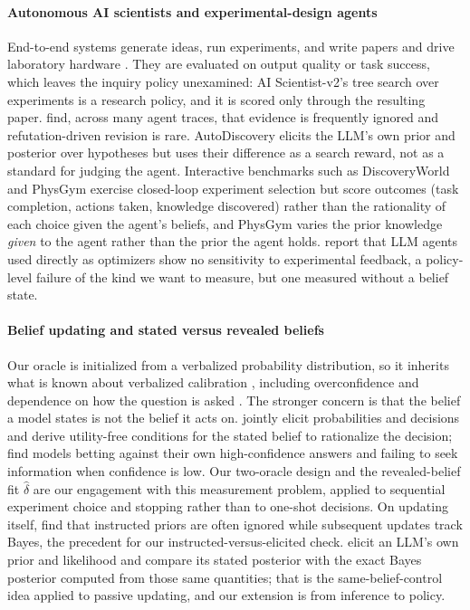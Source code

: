 \documentclass[10pt,letterpaper,twocolumn]{article}
\begin{document}
\paragraph{Autonomous AI scientists and experimental-design agents}
End-to-end systems generate ideas, run experiments, and write papers \citep{lu2024aiscientist,yamada2025aiscientistv2} and drive laboratory hardware \citep{boiko2023coscientist}. They are evaluated on output quality or task success, which leaves the inquiry policy unexamined: AI Scientist-v2's tree search over experiments is a research policy, and it is scored only through the resulting paper. \citet{riosgarcia2026aiscientists} find, across many agent traces, that evidence is frequently ignored and refutation-driven revision is rare. AutoDiscovery \citep{agarwal2025autodiscovery} elicits the LLM's own prior and posterior over hypotheses but uses their difference as a search reward, not as a standard for judging the agent. Interactive benchmarks such as DiscoveryWorld \citep{jansen2024discoveryworld} and PhysGym \citep{chen2025physgym} exercise closed-loop experiment selection but score outcomes (task completion, actions taken, knowledge discovered) rather than the rationality of each choice given the agent's beliefs, and PhysGym varies the prior knowledge \emph{given} to the agent rather than the prior the agent holds. \citet{gupta2025llmsbo} report that LLM agents used directly as optimizers show no sensitivity to experimental feedback, a policy-level failure of the kind we want to measure, but one measured without a belief state.

\paragraph{Belief updating and stated versus revealed beliefs}
Our oracle is initialized from a verbalized probability distribution, so it inherits what is known about verbalized calibration \citep{tian2023just,xiong2024can}, including overconfidence and dependence on how the question is asked \citep{sclar2024quantifying}. The stronger concern is that the belief a model states is not the belief it acts on. \citet{yamin2026when} jointly elicit probabilities and decisions and derive utility-free conditions for the stated belief to rationalize the decision; \citet{pal2025knowing} find models betting against their own high-confidence answers and failing to seek information when confidence is low. Our two-oracle design and the revealed-belief fit $\hat\delta$ are our engagement with this measurement problem, applied to sequential experiment choice and stopping rather than to one-shot decisions. On updating itself, \citet{gupta2025coinflips} find that instructed priors are often ignored while subsequent updates track Bayes, the precedent for our instructed-versus-elicited check. \citet{chen2026notbayesian} elicit an LLM's own prior and likelihood and compare its stated posterior with the exact Bayes posterior computed from those same quantities; that is the same-belief-control idea applied to passive updating, and our extension is from inference to policy.
\end{document}
